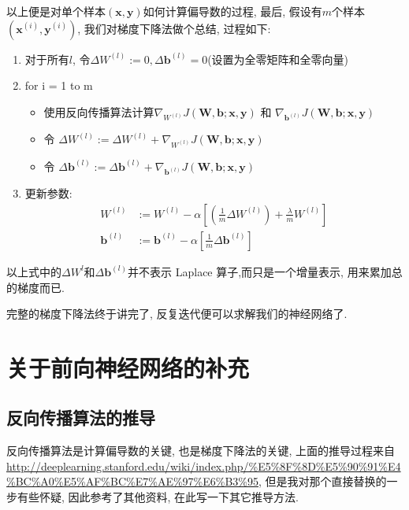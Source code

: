 \documentclass[a4paper,UTF8]{ctexart}
\theoremstyle{plain} \newtheorem{theorem}{定理}[section]
\theoremstyle{plain} \newtheorem{definition}{定义}[section]
\theoremstyle{plain} \newtheorem{lemma}{引理}[section]
\theoremstyle{plain} \newtheorem{proposition}{命题}[section]
\theoremstyle{plain} \newtheorem{example}{例}[section]
\theoremstyle{plain} \newtheorem{remark}{注}[section]
\theoremstyle{plain} \newtheorem{corollary}{推论}[section]
\begin{document}
以上便是对单个样本$(\bm{x},\bm{y})$如何计算偏导数的过程, 最后, 假设有$m$个样本$(\bm{x}^{(i)}, \bm{y}^{(i)})$, 我们对梯度下降法做个总结, 过程如下:
\begin{enumerate}[(1)]
\item 对于所有$l$, 令$\Delta W^{(l)} := 0, \Delta \bm{b}^{(l)} = 0$(设置为全零矩阵和全零向量)

\item  for i = 1 to m
\begin{itemize}
\item 使用反向传播算法计算$\nabla_{W^{(l)}} J(\bm{W},\bm{b};\bm{x},\bm{y})$ 和 $\nabla_{\bm{b}^{(l)}} J(\bm{W},\bm{b}; \bm{x},\bm{y})$

\item 令 $\Delta W^{(l)} := \Delta W^{(l)} + \nabla_{W^{(l)}} J(\bm{W},\bm{b}; \bm{x},\bm{y})$

\item 令 $\Delta \bm{b}^{(l)} := \Delta \bm{b}^{(l)} + \nabla_{\bm{b}^{(l)}} J(\bm{W},\bm{b}; \bm{x},\bm{y})$
\end{itemize}

\item 更新参数:
\begin{align*}
W^{(l)} & := W^{(l)} - \alpha \left[ \left( \frac{1}{m} \Delta W^{(l)} \right) + \frac{\lambda}{m} W^{(l)} \right] \\ 
\bm{b}^{(l)} & := \bm{b}^{(l)} - \alpha \left[ \frac{1}{m} \Delta \bm{b}^{(l)} \right]
\end{align*}


\end{enumerate}

以上式中的$\Delta W^{l}$和$\Delta \bm{b}^{(l)}$并不表示 Laplace 算子,而只是一个增量表示, 用来累加总的梯度而已.

完整的梯度下降法终于讲完了, 反复迭代便可以求解我们的神经网络了.


\section{关于前向神经网络的补充}
\subsection{反向传播算法的推导}
反向传播算法是计算偏导数的关键, 也是梯度下降法的关键, 上面的推导过程来自 \url{http://deeplearning.stanford.edu/wiki/index.php/%E5%8F%8D%E5%90%91%E4%BC%A0%E5%AF%BC%E7%AE%97%E6%B3%95}, 但是我对那个直接替换的一步有些怀疑, 因此参考了其他资料, 在此写一下其它推导方法.
\end{document}
